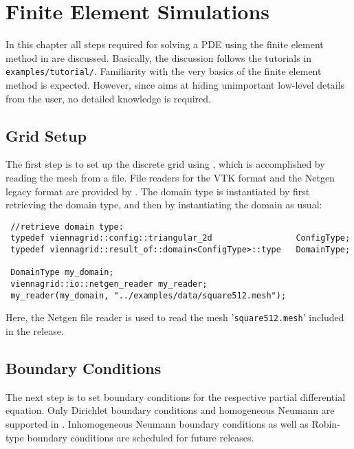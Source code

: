 
\chapter{Finite Element Simulations}  \label{chap:fem}

In this chapter all steps required for solving a PDE using the finite element method in {\ViennaFEM} are discussed.
Basically, the discussion follows the tutorials in \lstinline|examples/tutorial/|. 
Familiarity with the very basics of the finite element method is expected. However, since {\ViennaFEM} aims at hiding unimportant low-level details from the
user, no detailed knowledge is required.

\section{Grid Setup}
The first step is to set up the discrete grid using {\ViennaGrid},
which is accomplished by reading the mesh from a file. 
File readers for the VTK format \cite{VTK,VTKfileformat} and the Netgen legacy format \cite{netgen} are provided by {\ViennaGrid}.
The domain type is instantiated by first retrieving the domain type, and then by instantiating the domain as usual:
\begin{lstlisting}
 //retrieve domain type:
 typedef viennagrid::config::triangular_2d                 ConfigType;
 typedef viennagrid::result_of::domain<ConfigType>::type   DomainType;

 DomainType my_domain;
 viennagrid::io::netgen_reader my_reader;
 my_reader(my_domain, "../examples/data/square512.mesh");
\end{lstlisting}
Here, the Netgen file reader is used to read the mesh '\texttt{square512.mesh}' included in the {\ViennaFEM} release.



\section{Boundary Conditions}
The next step is to set boundary conditions for the respective partial differential equation.
Only Dirichlet boundary conditions and homogeneous Neumann are supported in {\ViennaFEMversion}.
Inhomogeneous Neumann boundary conditions as well as Robin-type boundary conditions are scheduled for future releases.

